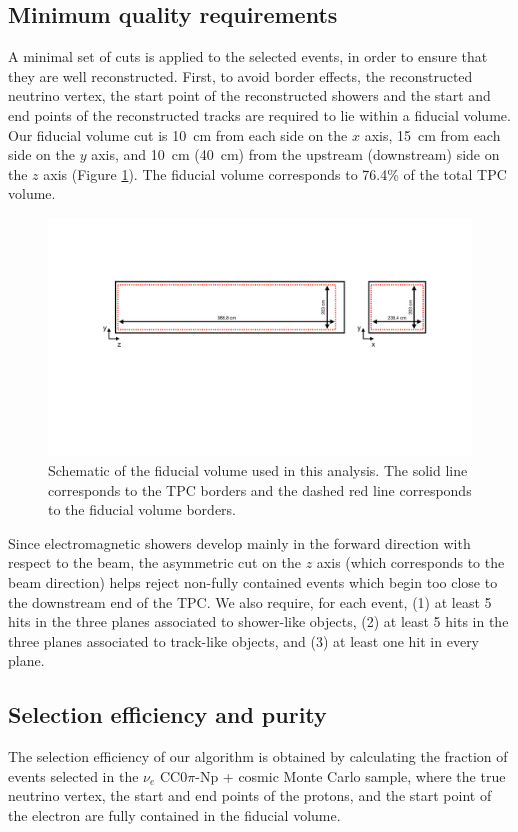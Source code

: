 \subsection{Minimum quality requirements}\label{sec:precuts}
A minimal set of cuts is applied to the selected events, in order to ensure that they are well reconstructed.
First, to avoid border effects, the reconstructed neutrino vertex, the start point of the reconstructed showers and the start and end points of the reconstructed tracks are required to lie within a fiducial volume. Our fiducial volume cut is 10~cm from each side on the $x$ axis, 15~cm from each side on the $y$ axis, and 10~cm (40~cm) from the upstream (downstream) side on the $z$ axis (Figure \ref{fig:fidvol}). The fiducial volume corresponds to 76.4\% of the total TPC volume. 

\begin{figure}
\centering
  \includegraphics[width=0.95\linewidth]{figures/fidvol.pdf}
  \caption{Schematic of the fiducial volume used in this analysis. The solid line corresponds to the TPC borders and the dashed red line corresponds to the fiducial volume borders.}
  \label{fig:fidvol}
\end{figure}

Since electromagnetic showers develop mainly in the forward direction with respect to the beam, the asymmetric cut on the $z$ axis (which corresponds to the beam direction) helps reject non-fully contained events which begin too close to the downstream end of the TPC.
We also require, for each event, (1) at least 5 hits in the three planes associated to shower-like objects, (2) at least 5 hits in the three planes associated to track-like objects, and (3) at least one hit in every plane.


\subsection{Selection efficiency and purity}\label{sec:eff}
The selection efficiency of our algorithm is obtained by calculating the fraction of events selected in the $\nu_{e}$ CC$0\pi$-Np + cosmic Monte Carlo sample, where the true neutrino vertex, the start and end points of the protons, and the start point of the electron are fully contained in the fiducial volume.

